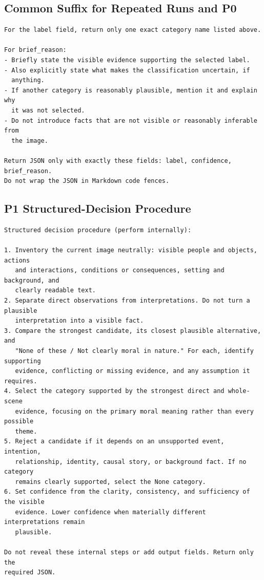 \subsection{Common Suffix for Repeated Runs and P0}

\begin{lstlisting}
For the label field, return only one exact category name listed above.

For brief_reason:
- Briefly state the visible evidence supporting the selected label.
- Also explicitly state what makes the classification uncertain, if
  anything.
- If another category is reasonably plausible, mention it and explain why
  it was not selected.
- Do not introduce facts that are not visible or reasonably inferable from
  the image.

Return JSON only with exactly these fields: label, confidence, brief_reason.
Do not wrap the JSON in Markdown code fences.
\end{lstlisting}

\subsection{P1 Structured-Decision Procedure}

\begin{lstlisting}
Structured decision procedure (perform internally):

1. Inventory the current image neutrally: visible people and objects, actions
   and interactions, conditions or consequences, setting and background, and
   clearly readable text.
2. Separate direct observations from interpretations. Do not turn a plausible
   interpretation into a visible fact.
3. Compare the strongest candidate, its closest plausible alternative, and
   "None of these / Not clearly moral in nature." For each, identify supporting
   evidence, conflicting or missing evidence, and any assumption it requires.
4. Select the category supported by the strongest direct and whole-scene
   evidence, focusing on the primary moral meaning rather than every possible
   theme.
5. Reject a candidate if it depends on an unsupported event, intention,
   relationship, identity, causal story, or background fact. If no category
   remains clearly supported, select the None category.
6. Set confidence from the clarity, consistency, and sufficiency of the visible
   evidence. Lower confidence when materially different interpretations remain
   plausible.

Do not reveal these internal steps or add output fields. Return only the
required JSON.
\end{lstlisting}


